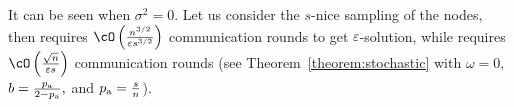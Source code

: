 \documentclass{article}
\newcommand*{\probavailable}{\ensuremath{p_{\textnormal{a}}}}
\begin{document}
\begin{table}
\begin{threeparttable}
\begin{tablenotes}
      \item [{\color{blue}(e)}] It can be seen when $\sigma^2 = 0.$ Let us consider the $s$-nice sampling of the nodes, then  requires $\cO\left(\frac{n^{3/2}}{\varepsilon s^{3/2}}\right)$ communication rounds to get $\varepsilon$-solution, while  requires $\cO\left(\frac{\sqrt{n}}{\varepsilon s}\right)$ communication rounds (see Theorem~\ref{theorem:stochastic} with $\omega = 0,$ $b = \frac{\probavailable}{2 - \probavailable},$ and $\probavailable = \frac{s}{n}$).
    \end{tablenotes}
\end{threeparttable}
\end{table}
\end{document}
